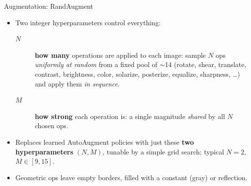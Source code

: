\begin{frame}{Augmentation: RandAugment}
  \begin{center}
  \end{center}
  \vspace{0.6em}
  \begin{itemize}
    \item Two integer hyperparameters control everything:
      \begin{description}
        \item[$N$] \textbf{how many} operations are applied to each image: sample $N$ ops \emph{uniformly at random} from a fixed pool of $\sim$14 (rotate, shear, translate, contrast, brightness, color, solarize, posterize, equalize, sharpness, \dots) and apply them \emph{in sequence}.
        \item[$M$] \textbf{how strong} each operation is: a single magnitude \emph{shared} by all $N$ chosen ops.
      \end{description}
    \item Replaces learned AutoAugment policies with just these \textbf{two hyperparameters} $(N, M)$, tunable by a simple grid search; typical $N{=}2$, $M{\in}[9,15]$.
    \item Geometric ops leave empty borders, filled with a constant (gray) or reflection.
  \end{itemize}
\end{frame}

